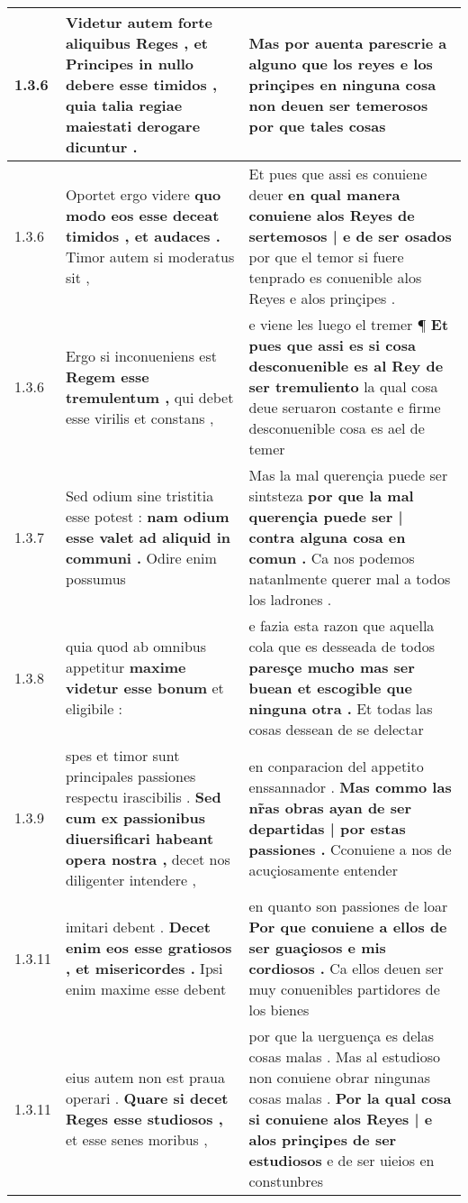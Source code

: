 \begin{tabular}{|p{1cm}|p{6.5cm}|p{6.5cm}|}
1.3.6 & Videtur autem forte aliquibus Reges , \textbf{ et Principes in nullo debere esse timidos , } quia talia regiae maiestati derogare dicuntur . & Mas por auenta parescrie a alguno que los reyes \textbf{ e los prinçipes en ninguna cosa non deuen ser temerosos } por que tales cosas \\\hline
1.3.6 & Oportet ergo videre \textbf{ quo modo eos esse deceat timidos , et audaces . } Timor autem si moderatus sit , & Et pues que assi es conuiene deuer \textbf{ en qual manera conuiene alos Reyes de sertemosos | e de ser osados } por que el temor si fuere tenprado es conuenible alos Reyes e alos prinçipes . \\\hline
1.3.6 & Ergo si inconueniens est \textbf{ Regem esse tremulentum , } qui debet esse virilis et constans , & e viene les luego el tremer ¶ \textbf{ Et pues que assi es si cosa desconuenible es al Rey de ser tremuliento } la qual cosa deue seruaron costante e firme desconuenible cosa es ael de temer \\\hline
1.3.7 & Sed odium sine tristitia esse potest : \textbf{ nam odium esse valet ad aliquid in communi . } Odire enim possumus & Mas la mal querençia puede ser sintsteza \textbf{ por que la mal querençia puede ser | contra alguna cosa en comun . } Ca nos podemos natanlmente querer mal a todos los ladrones . \\\hline
1.3.8 & quia quod ab omnibus appetitur \textbf{ maxime videtur esse bonum } et eligibile : & e fazia esta razon que aquella cola que es desseada de todos \textbf{ paresçe mucho mas ser buean et escogible que ninguna otra . } Et todas las cosas dessean de se delectar \\\hline
1.3.9 & spes et timor sunt principales passiones respectu irascibilis . \textbf{ Sed cum ex passionibus diuersificari habeant opera nostra , } decet nos diligenter intendere , & en conparacion del appetito enssannador . \textbf{ Mas commo las nr̃as obras ayan de ser departidas | por estas passiones . } Cconuiene a nos de acuçiosamente entender \\\hline
1.3.11 & imitari debent . \textbf{ Decet enim eos esse gratiosos , et misericordes . } Ipsi enim maxime esse debent & en quanto son passiones de loar \textbf{ Por que conuiene a ellos de ser guaçiosos e mis cordiosos . } Ca ellos deuen ser muy conuenibles partidores de los bienes \\\hline
1.3.11 & eius autem non est praua operari . \textbf{ Quare si decet Reges esse studiosos , } et esse senes moribus , & por que la uerguença es delas cosas malas . Mas al estudioso non conuiene obrar ningunas cosas malas . \textbf{ Por la qual cosa si conuiene alos Reyes | e alos prinçipes de ser estudiosos } e de ser uieios en constunbres \\\hline

\end{tabular}
